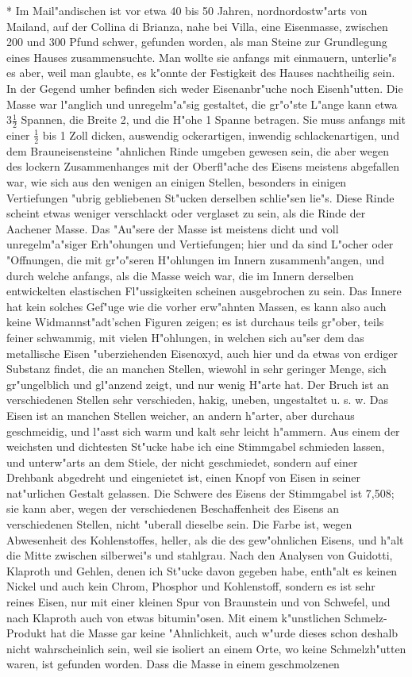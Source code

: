 \documentclass[a4paper, 11pt, oneside, polutonikogreek, german]{article}
\begin{document}
* Im Mail"andischen ist vor etwa 40 bis 50 Jahren, nordnordostw"arts von Mailand, auf der Collina di Brianza, nahe bei Villa, eine Eisenmasse, zwischen 200 und 300 Pfund schwer, gefunden worden, als man Steine zur Grundlegung eines Hauses zusammensuchte. Man wollte sie anfangs mit einmauern, unterlie"s es aber, weil man glaubte, es k"onnte der Festigkeit des Hauses nachtheilig sein. In der Gegend umher befinden sich weder Eisenanbr"uche noch Eisenh"utten. Die Masse war l"anglich und unregelm"a"sig gestaltet, die gr"o"ste L"ange kann etwa $\mathfrak{3\frac{1}{2}}$ Spannen, die Breite 2, und die H"ohe 1 Spanne betragen. Sie muss anfangs mit einer $\mathfrak{\frac{1}{2}}$ bis 1 Zoll dicken, auswendig ockerartigen, inwendig schlackenartigen, und dem Brauneisensteine "ahnlichen Rinde umgeben gewesen sein, die aber wegen des lockern Zusammenhanges mit der Oberfl"ache des Eisens meistens abgefallen war, wie sich aus den wenigen an einigen Stellen, besonders in einigen Vertiefungen "ubrig gebliebenen St"ucken derselben schlie"sen lie"s. Diese Rinde scheint etwas weniger verschlackt oder verglaset zu sein, als die Rinde der Aachener Masse. Das "Au"sere der Masse ist meistens dicht und voll unregelm"a"siger Erh"ohungen und Vertiefungen; hier und da sind L"ocher oder "Offnungen, die mit gr"o"seren H"ohlungen im Innern zusammenh"angen, und durch welche anfangs, als die Masse weich war, die im Innern derselben entwickelten elastischen Fl"ussigkeiten scheinen ausgebrochen zu sein. Das Innere hat kein solches Gef"uge wie die vorher erw"ahnten Massen, es kann also auch keine Widmannst"adt'schen Figuren zeigen; es ist durchaus teils gr"ober, teils feiner schwammig, mit vielen H"ohlungen, in welchen sich au"ser dem das metallische Eisen "uberziehenden Eisenoxyd, auch hier und da etwas von erdiger Substanz findet, die an manchen Stellen, wiewohl in sehr geringer Menge, sich gr"ungelblich und gl"anzend zeigt, und nur wenig H"arte hat. Der Bruch ist an verschiedenen Stellen sehr verschieden, hakig, uneben, ungestaltet u. s. w. Das Eisen ist an manchen Stellen weicher, an andern h"arter, aber durchaus geschmeidig, und l"asst sich warm und kalt sehr leicht h"ammern. Aus einem der weichsten und dichtesten St"ucke habe ich eine Stimmgabel schmieden lassen, und unterw"arts an dem Stiele, der nicht geschmiedet, sondern auf einer Drehbank abgedreht und eingenietet ist, einen Knopf von Eisen in seiner nat"urlichen Gestalt gelassen. Die Schwere des Eisens der Stimmgabel ist 7,508; sie kann aber, wegen der verschiedenen Beschaffenheit des Eisens an verschiedenen Stellen, nicht "uberall dieselbe sein. Die Farbe ist, wegen Abwesenheit des Kohlenstoffes, heller, als die des gew"ohnlichen Eisens, und h"alt die Mitte zwischen silberwei"s und stahlgrau. Nach den Analysen von Guidotti, Klaproth und Gehlen, denen ich St"ucke davon gegeben habe, enth"alt es keinen Nickel und auch kein Chrom, Phosphor und Kohlenstoff, sondern es ist sehr reines Eisen, nur mit einer kleinen Spur von Braunstein und von Schwefel, und nach Klaproth auch von etwas bitumin"osen. Mit einem k"unstlichen Schmelz-Produkt hat die Masse gar keine "Ahnlichkeit, auch w"urde dieses schon deshalb nicht wahrscheinlich sein, weil sie isoliert an einem Orte, wo keine Schmelzh"utten waren, ist gefunden worden. Dass die Masse in einem geschmolzenen 
\end{document}
